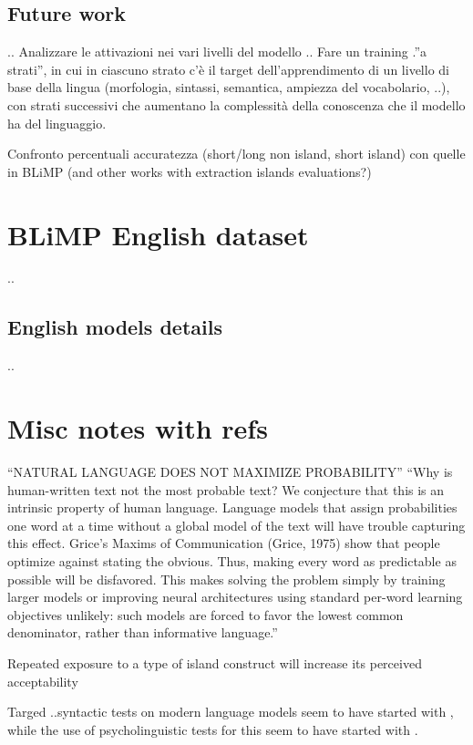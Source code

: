 \subsection{Future work}
..
Analizzare le attivazioni nei vari livelli del modello ..
Fare un training .”a strati”, in cui in ciascuno strato c’è il target dell’apprendimento di un livello di base della lingua (morfologia, sintassi, semantica, ampiezza del vocabolario, ..), con strati successivi che aumentano la complessità della conoscenza che il modello ha del linguaggio.


Confronto percentuali accuratezza (short/long non island, short island) con quelle in BLiMP
(and other works with extraction islands evaluations?)


\section{BLiMP English dataset}
..
\subsection{English models details}
..

\section{Misc notes with refs}

“NATURAL LANGUAGE DOES NOT MAXIMIZE PROBABILITY” 
“Why is human-written text not the most probable text? We conjecture that this is an intrinsic property of human language. Language models that assign probabilities one word at a time without a global model of the text will have trouble capturing this effect. Grice’s Maxims of Communication (Grice, 1975) show that people optimize against stating the obvious. Thus, making every word as predictable as possible will be disfavored. This makes solving the problem simply by training larger models or improving neural architectures using standard per-word learning objectives unlikely: such models are forced to favor the lowest common denominator, rather than informative language.” 
\citep{holtzman2019curious}

Repeated exposure to a type of island construct will increase its perceived acceptability 
\citep{chaves2014subject}

Targed ..syntactic tests on modern language models seem to have started with \citet{linzen2016assessing}, while the use of psycholinguistic tests for this seem to have started with \citet{futrell2018rnns}.

\nocite{wei2021frequency, hu2020systematic, lau2020furiously, bostrom2020byte, futrell-etal-2019-neural}
